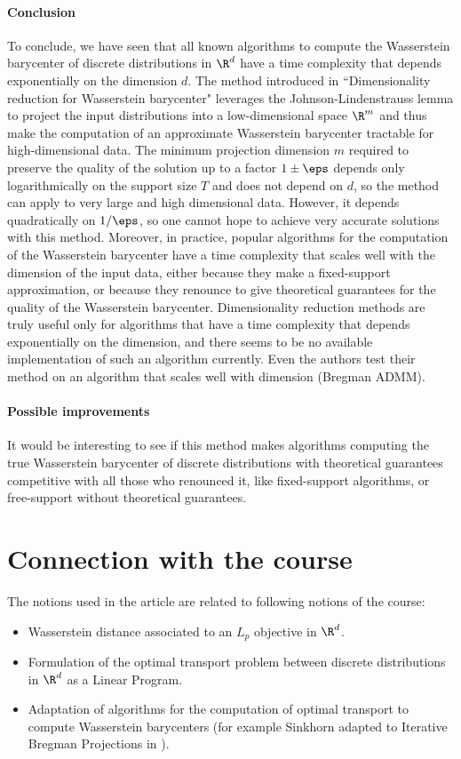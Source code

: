 \documentclass[11pt,a4paper]{article}
\begin{document}
\paragraph{Conclusion} To conclude, we have seen that all known algorithms to compute the Wasserstein barycenter of discrete distributions in $\R^d$ have a time complexity that depends exponentially on the dimension $d$. The method introduced in ``Dimensionality reduction for Wasserstein barycenter" \cite{izzo_dimensionality_2021} leverages the Johnson-Lindenstrauss lemma to project the input distributions into a low-dimensional space $\R^m$ and thus make the computation of an approximate Wasserstein barycenter tractable for high-dimensional data. The minimum projection dimension $m$ required to preserve the quality of the solution up to a factor $1 \pm \eps$ depends only logarithmically on the support size $T$ and does not depend on $d$, so the method can apply to very large and high dimensional data. However, it depends quadratically on $1 / \eps$, so one cannot hope to achieve very accurate solutions with this method. Moreover, in practice, popular algorithms for the computation of the Wasserstein barycenter have a time complexity that scales well with the dimension of the input data, either because they make a fixed-support approximation, or because they renounce to give theoretical guarantees for the quality of the Wasserstein barycenter. Dimensionality reduction methods are truly useful only for algorithms that have a time complexity that depends exponentially on the dimension, and there seems to be no available implementation of such an algorithm currently. Even the authors test their method on an algorithm that scales well with dimension (Bregman ADMM). 

\paragraph{Possible improvements} It would be interesting to see if this method makes algorithms computing the true Wasserstein barycenter of discrete distributions with theoretical guarantees competitive with all those who renounced it, like fixed-support algorithms, or free-support without theoretical guarantees.

\section{Connection with the course}
The notions used in the article are related to following notions of the course:
\begin{itemize}
    \item Wasserstein distance associated to an $L_p$ objective in $\R^d$.
    \item Formulation of the optimal transport problem between discrete distributions in $\R^d$ as a Linear Program.
    \item Adaptation of algorithms for the computation of optimal transport to compute Wasserstein barycenters (for example Sinkhorn adapted to Iterative Bregman Projections in \cite{benamou_iterative_2015}).
\end{itemize}


\newpage
\printbibliography
\end{document}
